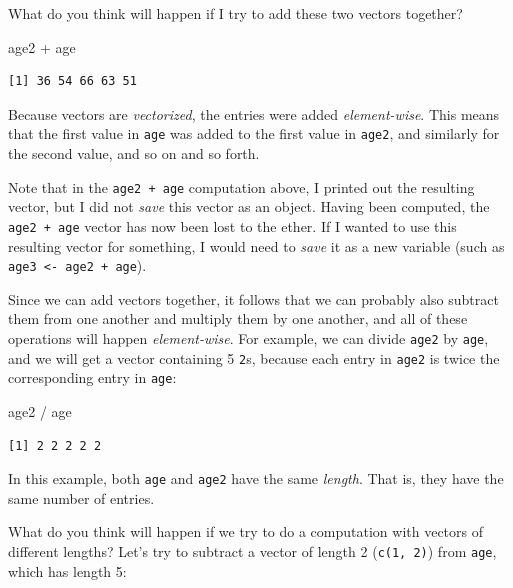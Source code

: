 \documentclass[
  letterpaper,
  DIV=11,
  numbers=noendperiod]{scrreprt}
\newenvironment{Shaded}{\begin{snugshade}}{\end{snugshade}}
\newcommand{\NormalTok}[1]{\textcolor[rgb]{0.00,0.23,0.31}{#1}}
\newcommand{\SpecialCharTok}[1]{\textcolor[rgb]{0.37,0.37,0.37}{#1}}
\begin{document}
What do you think will happen if I try to add these two vectors
together?

\begin{Shaded}
\begin{Highlighting}[]
\NormalTok{age2 }\SpecialCharTok{+}\NormalTok{ age}
\end{Highlighting}
\end{Shaded}

\begin{verbatim}
[1] 36 54 66 63 51
\end{verbatim}

Because vectors are \emph{vectorized}, the entries were added
\emph{element-wise}. This means that the first value in \texttt{age} was
added to the first value in \texttt{age2}, and similarly for the second
value, and so on and so forth.

Note that in the \texttt{age2\ +\ age} computation above, I printed out
the resulting vector, but I did not \emph{save} this vector as an
object. Having been computed, the \texttt{age2\ +\ age} vector has now
been lost to the ether. If I wanted to use this resulting vector for
something, I would need to \emph{save} it as a new variable (such as
\texttt{age3\ \textless{}-\ age2\ +\ age}).

Since we can add vectors together, it follows that we can probably also
subtract them from one another and multiply them by one another, and all
of these operations will happen \emph{element-wise}. For example, we can
divide \texttt{age2} by \texttt{age}, and we will get a vector
containing 5 \texttt{2}s, because each entry in \texttt{age2} is twice
the corresponding entry in \texttt{age}:

\begin{Shaded}
\begin{Highlighting}[]
\NormalTok{age2 }\SpecialCharTok{/}\NormalTok{ age}
\end{Highlighting}
\end{Shaded}

\begin{verbatim}
[1] 2 2 2 2 2
\end{verbatim}

In this example, both \texttt{age} and \texttt{age2} have the same
\emph{length}. That is, they have the same number of entries.

What do you think will happen if we try to do a computation with vectors
of different lengths? Let's try to subtract a vector of length 2
(\texttt{c(1,\ 2)}) from \texttt{age}, which has length 5:
\end{document}
